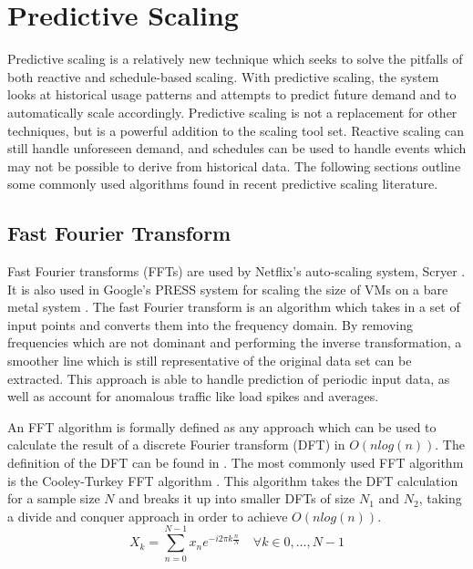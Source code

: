 \section{Predictive Scaling}
Predictive scaling is a relatively new technique which seeks to solve the pitfalls of both reactive and schedule-based scaling. With predictive scaling, the system looks at historical usage patterns and attempts to predict future demand and to automatically scale accordingly. Predictive scaling is not a replacement for other techniques, but is a powerful addition to the scaling tool set. Reactive scaling can still handle unforeseen demand, and schedules can be used to handle events which may not be possible to derive from historical data. The following sections outline some commonly used algorithms found in recent predictive scaling literature.

\subsection{Fast Fourier Transform}
\label{sec:fft}
Fast Fourier transforms (FFTs) are used by Netflix's auto-scaling system, Scryer \cite{scryer}. It is also used in Google's PRESS system for scaling the size of VMs on a bare metal system \cite{gong2010press}. The fast Fourier transform is an algorithm which takes in a set of input points and converts them into the frequency domain. By removing frequencies which are not dominant and performing the inverse transformation, a smoother line which is still representative of the original data set can be extracted. This approach is able to handle prediction of periodic input data, as well as account for anomalous traffic like load spikes and averages.

An FFT algorithm is formally defined as any approach which can be used to calculate the result of a discrete Fourier transform (DFT) in $O(n log(n))$. The definition of the DFT can be found in . The most commonly used FFT algorithm is the Cooley-Turkey FFT algorithm \cite{statistics}. This algorithm takes the DFT calculation for a sample size $N$ and breaks it up into smaller DFTs of size $N_1$ and $N_2$, taking a divide and conquer approach in order to achieve $O(n log(n))$.
\begin{equation}
\label{eq:dft}
X_k = \sum_{n=0}^{N-1} x_n e^{-i2\pi k \frac{n}{N}} \quad \forall k \in 0,\dots,N-1
\end{equation}

